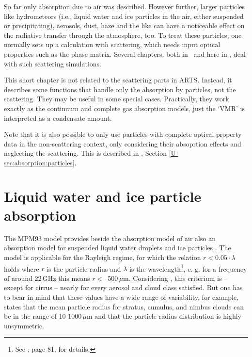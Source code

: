 So far only absorption due to air was described. However 
further, larger particles like hydrometeors (i.e., liquid water and
ice particles in the air, either suspended or precipitating),
aerosols, dust, haze and the like can have a noticeable effect on the radiative
transfer through the atmosphere, too.
To treat these particles, one normally sets up a calculation with
scattering, which needs input optical properties such as the phase
matrix. Several chapters, both in \user\ and here in \theory, deal
with such scattering simulations.

This short chapter is not related to the scattering parts in
ARTS. Instead, it describes some functions that handle only the
absorption by particles, not the scattering. They may be useful in
some special cases. Practically, they work exactly as the continuum
and complete gas absorption models, just the `VMR' is interpreted as a
condensate amount.

Note that it is also possible to only use particles with complete optical
property data in the non-scattering context, only considering their absoprtion
effects and neglecting the scattering. This is described in \user, Section
\ref{U-sec:absorption:particles}.

\section{Liquid water and ice particle absorption}
\label{sec:abs_theory:lipartabs}

The MPM93 model provides beside the absorption model of air also an
absorption model for suspended liquid water droplets and ice particles
\citep{liebe:89b,liebeetal:91,hufford:91,liebeetal:93}.  The model is
applicable for the Rayleigh regime, for which the relation $r <
0.05\cdot \lambda$ holds where $r$ is the particle radius and
$\lambda$ is the wavelength\footnote{See \citet{brussaard:95}, page
  81, for details.}, e. g. for a frequency of around 22\,GHz 
this means $r<$~500\,$\mu$m. Considering \citet{salby:96}, this criterium is --
except for cirrus -- nearly for every aerosol and cloud class
satisfied. But one has to bear in mind that these values have a wide
range of variability, for example, \citet{salby:96} states that the
mean particle radius for stratus, cumulus, and nimbus clouds can be in
the range of 10-1000\,$\mu$m and that the particle radius distribution
is highly unsymmetric. 

